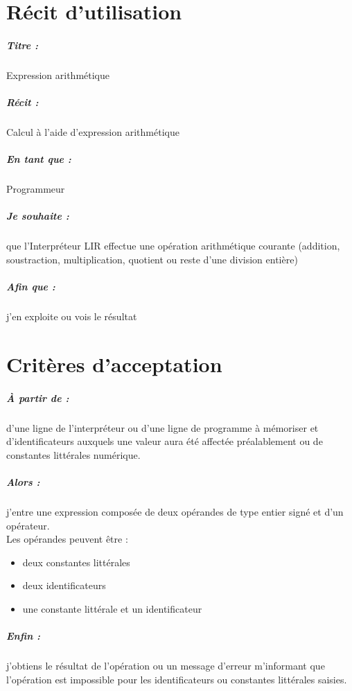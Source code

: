 \documentclass[12pt,a5paper, notitle, oneside]{report}
\begin{document}
    \chapter*{Récit d'utilisation}

    \paragraph{Titre : } Expression arithmétique
    \paragraph{Récit : } Calcul à l'aide d'expression arithmétique
    \paragraph{En tant que : } Programmeur
    \paragraph{Je souhaite : } que l'Interpréteur LIR effectue une
    opération arithmétique courante (addition, soustraction,
    multiplication, quotient ou reste d'une division entière)
    \paragraph{Afin que : } j'en exploite ou vois le résultat
    \newpage

    \chapter*{Critères d'acceptation}

    \paragraph{À partir de : } d'une ligne de l'interpréteur ou d'une
    ligne de programme à mémoriser et d'identificateurs auxquels une
    valeur aura été affectée préalablement ou de constantes littérales
    numérique.

    \paragraph{Alors : } j'entre une expression composée de deux
    opérandes de type entier signé et d'un opérateur.
    \\ Les opérandes peuvent être :
    \begin{itemize}
        \item deux constantes littérales
        \item deux identificateurs
        \item une constante littérale et un identificateur
    \end{itemize}
    \paragraph{Enfin : } j'obtiens le résultat de l'opération ou un
    message d'erreur m'informant que l'opération est impossible pour les
    identificateurs ou constantes littérales saisies.
\end{document}
